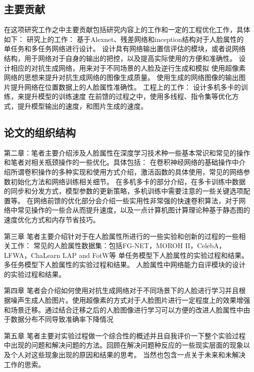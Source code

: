 \subsection{主要贡献}
在这项研究工作之中主要贡献包括研究内容上的工作和一定的工程优化工作，具体如下：
研究上的工作：
基于Alexnet、残差网络和inception结构对于人脸属性的单任务和多任务网络进行设计。
设计具有网络输出置信评估的模块，或者说网络结构，用于网络对于自身的输出的把控，以及提高实际使用的方便和准确性。
设计相应的对抗生成网络，用来对于不同场景的人脸及逆行生成和模拟
使用超像素网络的思想来提升对抗生成网络的图像生成质量。
使用生成的网络图像的输出图片提升网络在位置数据上的人脸属性准确性。
工程上的工作：
设计多机多卡的训练，来提升模型的训练速度
在前馈的过程之中，使用多线程、指令集等优化方式，提升模型输出的速度，和图片生成的速度。

\subsection{论文的组织结构}
第二章：笔者主要介绍涉及人脸属性在深度学习技术种一些基本常识和常见的操作和笔者对相关瓶颈操作的一些优化。具体包括：
在卷积神经网络的基础操作中介绍所谓卷积操作的多种实现和使用方式介绍，激活函数的具体使用，常见的网络参数初始化方法和网络训练相关细节。
在多机多卡的部分介绍，在多卡训练中数据的同步和分发方式，模型参数的更新策略，多机训练中需要注意的一些关键选项配置等。
在网络前馈的优化部分会介绍一些实用性非常强的快速卷积算法，对于网络中常见操作的一些合从而提升速度，以及一点计算机图计算理论种基于静态图的速度优化方式和内存节省技巧。

第三章
笔者主要介绍针对于在人脸属性所进行的一些实验和创新的过程的一些相关工作：
常见的人脸属性数据集：包括FG-NET，MOROH II，CelebA，LFWA，ChaLearn LAP and FotW等
单任务模型下人脸属性的实验过程和结果。
多任务模型下人脸属性的实验过程和结果。
人脸属性中网络能力自评模块的设计的实验过程和结果。

第四章
笔者会介绍如何使用对抗生成网络对于不同场景下的人脸进行学习并且根据噪声生成人脸图片。使用超像素的方式对于人脸图片进行一定程度上的效果增强和场景迁移。通过结合迁移之后的人脸图像进行学习可以方便的改进人脸属性中由于数据分布不同导致准确率下降情况

第五章
笔者主要对实验过程做一个综合性的概述并且自我评价一下整个实验过程中出现的问题和解决问题的方法。回顾在解决问题种反应的一些现实层面的现象以及个人对这些现象出现的原因和结果的思考。
当然也包含一点关于未来和未解决工作的思索。
